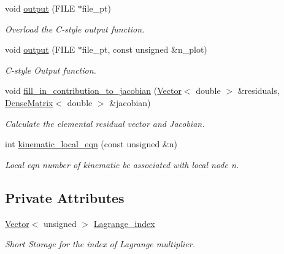 \begin{DoxyCompactItemize}
void \hyperlink{classoomph_1_1ElasticLineFluidInterfaceBoundingElement_a0979784b94ab8285a964ab14077b8320}{output} (F\+I\+LE $\ast$file\+\_\+pt)
\begin{DoxyCompactList}\small\item\em Overload the C-\/style output function. \end{DoxyCompactList}\item 
void \hyperlink{classoomph_1_1ElasticLineFluidInterfaceBoundingElement_a6e4c4d356c7d66f6b5ec4c7a375ecc91}{output} (F\+I\+LE $\ast$file\+\_\+pt, const unsigned \&n\+\_\+plot)
\begin{DoxyCompactList}\small\item\em C-\/style Output function. \end{DoxyCompactList}\item 
void \hyperlink{classoomph_1_1ElasticLineFluidInterfaceBoundingElement_a71b23e3ad49d5137ca4a7f654f828077}{fill\+\_\+in\+\_\+contribution\+\_\+to\+\_\+jacobian} (\hyperlink{classoomph_1_1Vector}{Vector}$<$ double $>$ \&residuals, \hyperlink{classoomph_1_1DenseMatrix}{Dense\+Matrix}$<$ double $>$ \&jacobian)
\begin{DoxyCompactList}\small\item\em Calculate the elemental residual vector and Jacobian. \end{DoxyCompactList}\item 
int \hyperlink{classoomph_1_1ElasticLineFluidInterfaceBoundingElement_a0f3d4bdd756165d6a2225f5b13eac005}{kinematic\+\_\+local\+\_\+eqn} (const unsigned \&n)
\begin{DoxyCompactList}\small\item\em Local eqn number of kinematic bc associated with local node n. \end{DoxyCompactList}\end{DoxyCompactItemize}
\subsection*{Private Attributes}
\begin{DoxyCompactItemize}
\item 
\hyperlink{classoomph_1_1Vector}{Vector}$<$ unsigned $>$ \hyperlink{classoomph_1_1ElasticLineFluidInterfaceBoundingElement_ab60624e63f1ef1b59d191a83b16eb1de}{Lagrange\+\_\+index}
\begin{DoxyCompactList}\small\item\em Short Storage for the index of Lagrange multiplier. \end{DoxyCompactList}\end{DoxyCompactItemize}
